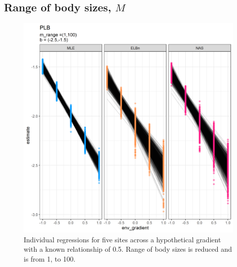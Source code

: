 \documentclass[
]{article}
\begin{document}
\newpage

\hypertarget{range-of-body-sizes-m}{%
\subsection{\texorpdfstring{Range of body sizes,
\(M\)}{Range of body sizes, M}}\label{range-of-body-sizes-m}}

\begin{figure}
\centering
\includegraphics{figures/PLB_small_m_main.png}
\caption{Individual regressions for five sites across a hypothetical
gradient with a known relationship of 0.5. Range of body sizes is
reduced and is from 1, to 100.}
\end{figure}

\newpage
\end{document}
